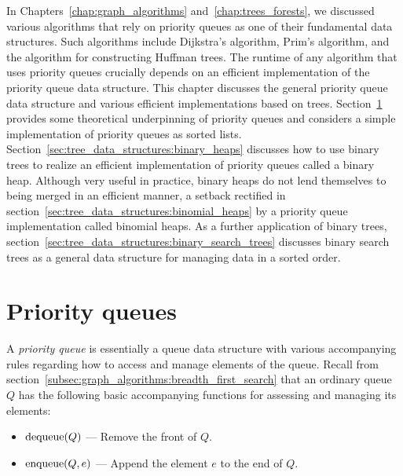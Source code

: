 \noindent
In Chapters~\ref{chap:graph_algorithms} and~\ref{chap:trees_forests},
we discussed various algorithms that rely on
priority queues as one of their fundamental data
structures. Such algorithms include
Dijkstra's algorithm,
Prim's algorithm, and the algorithm for
constructing Huffman trees. The runtime of any
algorithm that uses priority queues crucially depends on an efficient
implementation of the priority queue data
structure. This chapter discusses the general priority queue data
structure and various efficient implementations based on trees.
Section~\ref{sec:tree_data_structures:priority_queues} provides some
theoretical underpinning of priority queues and considers a simple
implementation of priority queues as sorted lists.
Section~\ref{sec:tree_data_structures:binary_heaps} discusses how to
use binary trees to realize an efficient
implementation of priority queues called a binary
heap. Although very useful in practice, binary heaps do not lend
themselves to being merged in an efficient manner, a setback rectified
in section~\ref{sec:tree_data_structures:binomial_heaps} by a priority
queue implementation called binomial heaps. As a
further application of binary trees,
section~\ref{sec:tree_data_structures:binary_search_trees} discusses
binary search trees as a general data
structure for managing data in a sorted order.



\section{Priority queues}
\label{sec:tree_data_structures:priority_queues}

A \emph{priority queue} is essentially a queue
data structure with various accompanying rules regarding how to access
and manage elements of the queue. Recall from
section~\ref{subsec:graph_algorithms:breadth_first_search} that an
ordinary queue $Q$ has the following basic accompanying functions for
assessing and managing its elements:
\begin{itemize}
\item $\operatorname*{dequeue}(Q)$ --- Remove the front of $Q$.

\item $\operatorname*{enqueue}(Q, e)$ --- Append the element $e$ to the end of $Q$.
\end{itemize}

